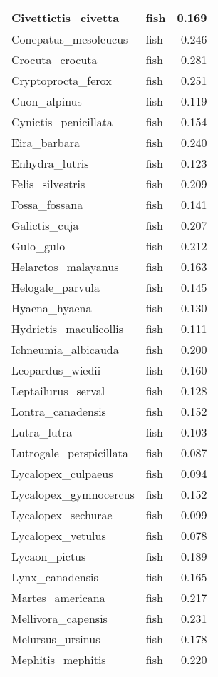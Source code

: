 \begin{table}
\begin{tabular}[t]{l|l|r}
\hline
Civettictis\_civetta & fish & 0.169\\
\hline
Conepatus\_mesoleucus & fish & 0.246\\
\hline
Crocuta\_crocuta & fish & 0.281\\
\hline
Cryptoprocta\_ferox & fish & 0.251\\
\hline
Cuon\_alpinus & fish & 0.119\\
\hline
Cynictis\_penicillata & fish & 0.154\\
\hline
Eira\_barbara & fish & 0.240\\
\hline
Enhydra\_lutris & fish & 0.123\\
\hline
Felis\_silvestris & fish & 0.209\\
\hline
Fossa\_fossana & fish & 0.141\\
\hline
Galictis\_cuja & fish & 0.207\\
\hline
Gulo\_gulo & fish & 0.212\\
\hline
Helarctos\_malayanus & fish & 0.163\\
\hline
Helogale\_parvula & fish & 0.145\\
\hline
Hyaena\_hyaena & fish & 0.130\\
\hline
Hydrictis\_maculicollis & fish & 0.111\\
\hline
Ichneumia\_albicauda & fish & 0.200\\
\hline
Leopardus\_wiedii & fish & 0.160\\
\hline
Leptailurus\_serval & fish & 0.128\\
\hline
Lontra\_canadensis & fish & 0.152\\
\hline
Lutra\_lutra & fish & 0.103\\
\hline
Lutrogale\_perspicillata & fish & 0.087\\
\hline
Lycalopex\_culpaeus & fish & 0.094\\
\hline
Lycalopex\_gymnocercus & fish & 0.152\\
\hline
Lycalopex\_sechurae & fish & 0.099\\
\hline
Lycalopex\_vetulus & fish & 0.078\\
\hline
Lycaon\_pictus & fish & 0.189\\
\hline
Lynx\_canadensis & fish & 0.165\\
\hline
Martes\_americana & fish & 0.217\\
\hline
Mellivora\_capensis & fish & 0.231\\
\hline
Melursus\_ursinus & fish & 0.178\\
\hline
Mephitis\_mephitis & fish & 0.220\\

\end{tabular}
\end{table}
